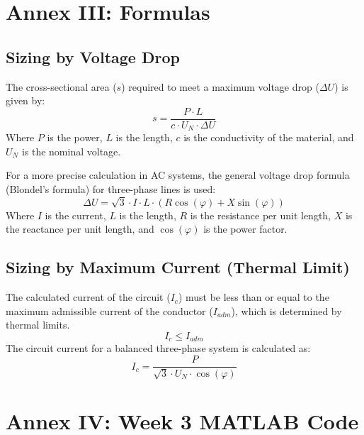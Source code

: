 \documentclass[12pt, a4paper]{article}
\begin{document}
\newpage
\section{Annex III: Formulas}
\subsection{Sizing by Voltage Drop}
The cross-sectional area ($s$) required to meet a maximum voltage drop ($\Delta U$) is given by:
\begin{equation}
    s = \frac{P \cdot L}{c \cdot U_N \cdot \Delta U}
\end{equation}
Where $P$ is the power, $L$ is the length, $c$ is the conductivity of the material, and $U_N$ is the nominal voltage.

For a more precise calculation in AC systems, the general voltage drop formula (Blondel's formula) for three-phase lines is used:
\begin{equation}
    \Delta U = \sqrt{3} \cdot I \cdot L \cdot (R \cos(\varphi) + X \sin(\varphi))
\end{equation}
Where $I$ is the current, $L$ is the length, $R$ is the resistance per unit length, $X$ is the reactance per unit length, and $\cos(\varphi)$ is the power factor.

\subsection{Sizing by Maximum Current (Thermal Limit)}
The calculated current of the circuit ($I_c$) must be less than or equal to the maximum admissible current of the conductor ($I_{adm}$), which is determined by thermal limits.
\begin{equation}
    I_c \leq I_{adm}
\end{equation}
The circuit current for a balanced three-phase system is calculated as:
\begin{equation}
    I_c = \frac{P}{\sqrt{3} \cdot U_N \cdot \cos(\varphi)}
\end{equation}

\newpage
\section{Annex IV: Week 3 MATLAB Code}
\end{document}
